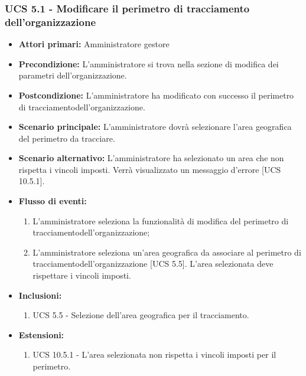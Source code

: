 \subsubsection{UCS 5.1 - Modificare il perimetro di tracciamento dell'organizzazione}%
\begin{itemize}
    \item \textbf{Attori primari:} Amministratore gestore
    \item \textbf{Precondizione:} L'amministratore si trova nella sezione di modifica dei parametri dell'organizzazione.
    \item \textbf{Postcondizione:} L'amministratore ha modificato con successo il perimetro di tracciamentodell'organizzazione.
    \item \textbf{Scenario principale:} L'amministratore dovrà selezionare l'area geografica del perimetro da tracciare.
     \item \textbf{Scenario alternativo:} L'amministratore ha selezionato un area che non rispetta i vincoli imposti. Verrà visualizzato un messaggio d'errore [UCS 10.5.1].
    \item \textbf{Flusso di eventi:}
    \begin{enumerate}%
        \item L'amministratore seleziona la funzionalità di modifica del perimetro di tracciamentodell'organizzazione;
        \item L'amministratore seleziona un'area geografica da associare al perimetro di tracciamentodell'organizzazione [UCS 5.5]. L'area selezionata deve rispettare i vincoli imposti.
    \end{enumerate}
    \item \textbf{Inclusioni:}
    \begin{enumerate}
        \item UCS 5.5 - Selezione dell'area geografica per il tracciamento.
    \end{enumerate}
    \item \textbf{Estensioni:}
    \begin{enumerate}
        \item UCS 10.5.1 - L'area selezionata non rispetta i vincoli imposti per il perimetro.
    \end{enumerate}
\end{itemize}

